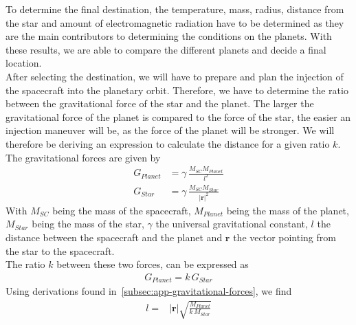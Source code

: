 \documentclass[reprint,english,notitlepage]{revtex4-2}
\begin{document}
To determine the final destination, the temperature, mass, radius, distance from the star and amount of electromagnetic radiation have to be determined as they are the main contributors to determining the conditions on the planets.
With these results, we are able to compare the different planets and decide a final location.\\

After selecting the destination, we will have to prepare and plan the injection of the spacecraft into the planetary orbit.
Therefore, we have to determine the ratio between the gravitational force of the star and the planet.
The larger the gravitational force of the planet is compared to the force of the star, the easier an injection maneuver will be, as the force of the planet will be stronger.
We will therefore be deriving an expression to calculate the distance for a given ratio $k$.
The gravitational forces are given by
\begin{align}
    G_{Planet} &= \gamma \, \frac{M_{SC}M_{Planet}}{l^2} \label{G_Planet}\\
	G_{Star} &= \gamma \, \frac{M_{SC}M_{Star}}{|\textbf{r}|^2} \label{G_Star}
\end{align}
With $M_{SC}$ being the mass of the spacecraft, $M_{Planet}$ being the mass of the planet, $M_{Star}$ being the mass of the star, $\gamma$ the universal gravitational constant, $l$ the distance between the spacecraft and the planet and $\textbf{r}$ the vector pointing from the star to the spacecraft.\\
The ratio $k$ between these two forces, can be expressed as
\begin{align}
    G_{Planet} = k\, G_{Star} \label{grav_forces}
\end{align}
Using derivations found in~\ref{subsec:app-gravitational-forces}, we find
\begin{align*}
	l =& |\textbf{r}|\sqrt{\frac{M_{Planet}}{k\,M_{Star}}}
\end{align*}\\
\end{document}
